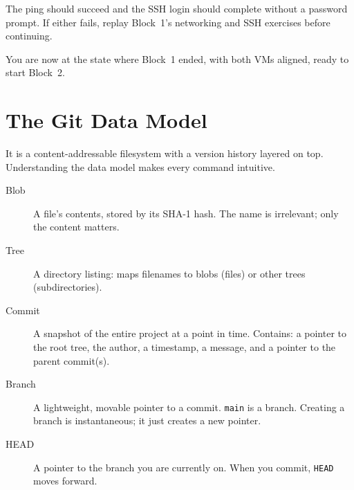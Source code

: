The ping should succeed and the SSH login should complete without a password prompt. If either fails, replay Block~1's networking and SSH exercises before continuing.


You are now at the state where Block~1 ended, with both VMs aligned, ready to start Block~2.



\newpage
\section{The Git Data Model}

 It is a content-addressable 
filesystem with a version history layered on top.
Understanding the data model makes every command intuitive.


\begin{description}
    \item[Blob] A file's contents, stored by its SHA-1 hash. The name is irrelevant; only the content matters.
    \item[Tree] A directory listing: maps filenames to blobs (files) or other trees (subdirectories).
    \item[Commit] A snapshot of the entire project at a point in time. Contains: a pointer to the root tree,
    the author, a timestamp, a message, and a pointer to the parent commit(s).
    \item[Branch] A lightweight, movable pointer to a commit. \texttt{main} is a branch.
    Creating a branch is instantaneous; it just creates a new pointer.
    \item[HEAD] A pointer to the branch you are currently on. When you commit, \texttt{HEAD} moves forward.
\end{description}

